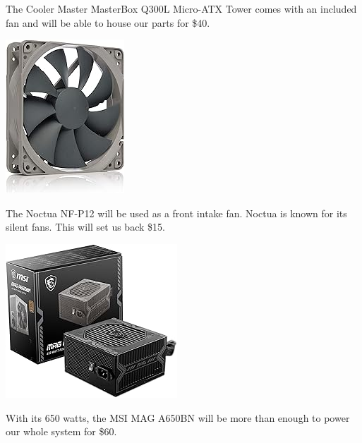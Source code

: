 \documentclass[12pt, a4paper]{article}
\begin{document}
The Cooler Master MasterBox Q300L Micro-ATX Tower comes with an included
fan and will be able to house our parts for \$40. 

\vspace{4pt}
\begin{center}
  \includegraphics[scale=0.6]{faaaaaaannnnn.jpg}
\end{center}
The Noctua NF-P12 will be used as a front intake fan. Noctua is known
for its silent fans. This will set us back \$15.

\vspace{4pt}
\begin{center}
  \includegraphics[scale=0.6]{can_you_feel_the_powaaaaaaaa.jpg}
\end{center}
With its 650 watts, the MSI MAG A650BN will be more than enough to
power our whole system for \$60.


\end{document}

